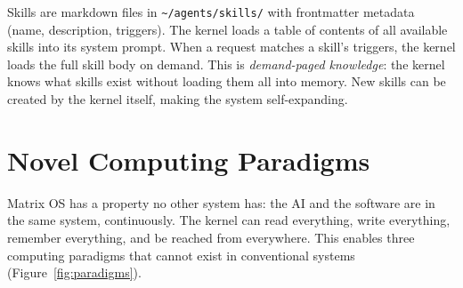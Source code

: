 \documentclass[11pt,a4paper]{article}
\begin{document}
Skills are markdown files in \texttt{\textasciitilde/agents/skills/} with frontmatter metadata (name, description, triggers). The kernel loads a table of contents of all available skills into its system prompt. When a request matches a skill's triggers, the kernel loads the full skill body on demand. This is \emph{demand-paged knowledge}: the kernel knows what skills exist without loading them all into memory. New skills can be created by the kernel itself, making the system self-expanding.

\section{Novel Computing Paradigms}
\label{sec:paradigms}

Matrix OS has a property no other system has: the AI and the software are in the same system, continuously. The kernel can read everything, write everything, remember everything, and be reached from everywhere. This enables three computing paradigms that cannot exist in conventional systems (Figure~\ref{fig:paradigms}).
\end{document}
